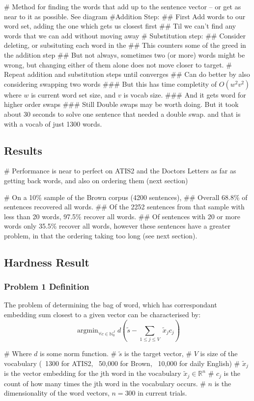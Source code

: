 \documentclass[]{scrartcl}
\numberwithin{equation}{section}
\numberwithin{figure}{section}
\theoremstyle{plain}
\theoremstyle{definition}
\DeclareMathOperator*{\argmin}{argmin}
\begin{document}
\begin{easylist}[itemize]
	# Method for finding the words that add up to the sentence vector -- or get as near to it as possible. See diagram
	#Addition Step:
	## First Add words to our word set, adding the one which gets us closest first
	## Til we can't find any words that we can add without moving away
	# Substitution step:
	## Consider deleting, or subsituting each word in the
	## This counters some of the greed in the addition step
	## But not always, sometimes two (or more) words might be wrong, but changing either of them alone does not move closer to target.
	# Repeat addition and substitution steps until converges
	## Can do better by also considering swapping two words
	### But this has time completity of $O(w^2 v^2)$ where $w$ is current word set size, and $v$ is vocab size.
	### And it gets word for higher order swaps
	### Still Double swaps may be worth doing. But it took about 30 seconds to solve one sentence that needed a double swap. and that is with a vocab of just 1300 words.
\end{easylist}

\subsection{Results}
\begin{easylist}[itemize]
	# Performance is near to perfect on ATIS2 and the Doctors Letters as far as getting back words, and also on ordering them (next section)
	
	# On a 10\% sample of the Brown corpus (4200 sentences),
	## Overall 68.8\% of sentences recovered all words.
	## Of the 2252 sentences from that sample with less than 20 words, 97.5\% recover all words. 
	## Of sentences with 20 or more words only 35.5\% recover all words, however these sentences have a greater problem, in that the ordering taking too long (see next section).
\end{easylist}

\subsection{Hardness Result}

\subsubsection{{Problem 1 Definition}}
The problem of determining the bag of word, which has correspondant embedding sum closest to a given vector can be characterised by:
$$\argmin_{\forall c\in\mathbb{N}_0^J} d(\tilde{s} - \sum_{1\le j\le V}\:\tilde{x}_{j}c_{j})$$
\begin{easylist}[itemize]
# Where $d$ is some norm function.
# $\tilde{s}$ is the target vector,
# $V$ is size of the vocabulary (~1300 for ATIS2, ~50,000 for Brown, ~10,000 for daily English)
# $\tilde{x}_j$ is the vector embedding for the jth word in the vocabulary $\tilde{x}_j \in \mathbb{R}^n$
# $c_j$ is the count of how many times the jth word in the vocabulary occurs.
# $n$ is the dimensionality of the word vectors, $n = 300$ in current trials.  
\end{easylist}
\end{document}
